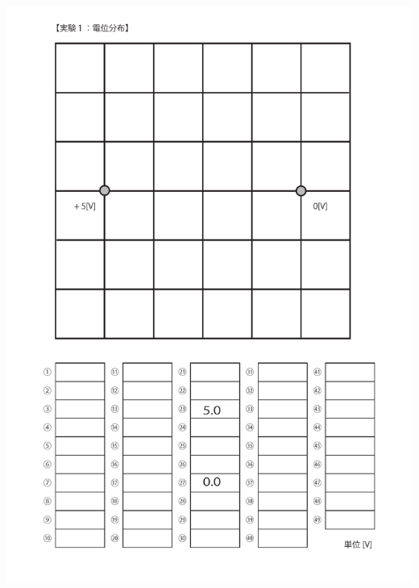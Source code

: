 \documentclass[uplatex,a4paper,11pt,oneside,openany]{jsbook}
\begin{document}
\includegraphics[scale=0.8]{./figure/E3.pdf}

\newpage
\end{document}

